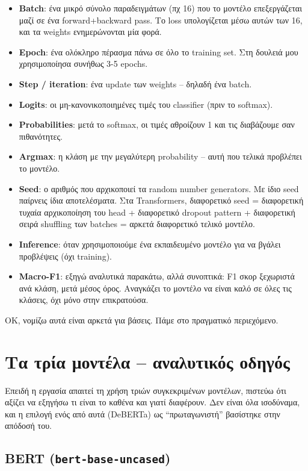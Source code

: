 \documentclass[12pt]{fphw}
\begin{document}
\begin{itemize}
    \item \textbf{Batch}: ένα μικρό σύνολο παραδειγμάτων (πχ 16) που το μοντέλο επεξεργάζεται μαζί σε ένα forward+backward pass. Το loss υπολογίζεται μέσω αυτών των 16, και τα weights ενημερώνονται μία φορά.
    \item \textbf{Epoch}: ένα ολόκληρο πέρασμα πάνω σε όλο το training set. Στη δουλειά μου χρησιμοποίησα συνήθως 3-5 epochs.
    \item \textbf{Step / iteration}: ένα update των weights -- δηλαδή ένα batch.
    \item \textbf{Logits}: οι μη-κανονικοποιημένες τιμές του classifier (πριν το softmax).
    \item \textbf{Probabilities}: μετά το softmax, οι τιμές αθροίζουν 1 και τις διαβάζουμε σαν πιθανότητες.
    \item \textbf{Argmax}: η κλάση με την μεγαλύτερη probability -- αυτή που τελικά προβλέπει το μοντέλο.
    \item \textbf{Seed}: ο αριθμός που αρχικοποιεί τα random number generators. Με ίδιο seed παίρνεις ίδια αποτελέσματα. Στα Transformers, διαφορετικό seed = διαφορετική τυχαία αρχικοποίηση του head + διαφορετικό dropout pattern + διαφορετική σειρά shuffling των batches = αρκετά διαφορετικό τελικό μοντέλο.
    \item \textbf{Inference}: όταν χρησιμοποιούμε ένα εκπαιδευμένο μοντέλο για να βγάλει προβλέψεις (όχι training).
    \item \textbf{Macro-F1}: εξηγώ αναλυτικά παρακάτω, αλλά συνοπτικά: F1 σκορ ξεχωριστά ανά κλάση, μετά μέσος όρος. Αναγκάζει το μοντέλο να είναι καλό σε όλες τις κλάσεις, όχι μόνο στην επικρατούσα.
\end{itemize}

OK, νομίζω αυτά είναι αρκετά για βάσεις. Πάμε στο πραγματικό περιεχόμενο.

\section{Τα τρία μοντέλα -- αναλυτικός οδηγός}

Επειδή η εργασία απαιτεί τη χρήση τριών συγκεκριμένων μοντέλων, πιστεύω ότι αξίζει να εξηγήσω τι είναι το καθένα και γιατί διαφέρουν. Δεν είναι όλα ισοδύναμα, και η επιλογή ενός από αυτά (DeBERTa) ως ``πρωταγωνιστή'' βασίστηκε στην απόδοσή του.

\subsection{BERT (\texttt{bert-base-uncased})}
\end{document}
